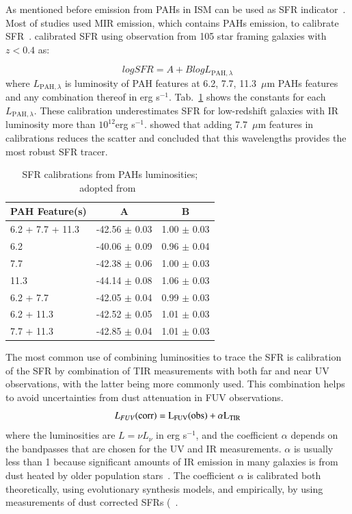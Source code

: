 As mentioned before emission from PAHs in ISM can be used as SFR indicator~\citep[e.g.][]{Peeters04}.
Most of studies used MIR emission, which contains PAHs emission, to calibrate SFR~\citep[e.g.][]{Calzetti07}.
\cite{Shipley16} calibrated SFR using observation from 105 star framing galaxies with $z < 0.4$ as:

\begin{equation}
log SFR = A + B log L_{\mathrm{PAH}, \lambda}
\end{equation}
where $L_{\mathrm{PAH}, \lambda}$ is luminosity of PAH features at 6.2, 7.7, 11.3~$\mu$m PAHs features and any combination thereof in erg s$^{-1}$.
Tab.~\ref{table_PAH} shows the constants for each $L_{\mathrm{PAH}, \lambda}$.
These calibration underestimates SFR for low-redshift galaxies with IR luminosity more than $10^12$erg s$^{-1}$.
\cite{Shipley16} showed that adding 7.7~$\mu$m features in calibrations reduces the scatter and concluded that this wavelengths provides the most robust SFR tracer.


\begin{table}
\centering
\caption{SFR calibrations from PAHs luminosities; adopted from~\cite{Shipley16}}
\label{table_PAH}
\begin{tabular}{ l c c}
\hline\hline
PAH Feature(s) & A & B\\
\hline
6.2 + 7.7 + 11.3 & -42.56 $\pm$ 0.03 & 1.00 $\pm$ 0.03 \\ 
6.2 & -40.06 $\pm$ 0.09 & 0.96 $\pm$ 0.04 \\ 
7.7 & -42.38 $\pm$ 0.06 & 1.00 $\pm$ 0.03 \\ 
11.3 & -44.14 $\pm$ 0.08 & 1.06 $\pm$ 0.03 \\ 
6.2 + 7.7 & -42.05 $\pm$ 0.04 & 0.99 $\pm$ 0.03 \\ 
6.2 + 11.3 & -42.52 $\pm$ 0.05 & 1.01 $\pm$ 0.03 \\ 
7.7 + 11.3 & -42.85 $\pm$ 0.04 & 1.01 $\pm$ 0.03 \\ 
\hline
\end{tabular}
\end{table}  

The most common use of combining luminosities to trace the SFR is calibration of the SFR by combination of TIR measurements with both far and near UV observations, with the latter being more commonly used. 
This combination helps to avoid uncertainties from dust attenuation in FUV observations.
\begin{equation}
L_{FUV}(\rm corr) = L_{FUV}(\rm obs) + \alpha L_{\rm TIR}
\end{equation}
where the luminosities are $L = \nu L_{\nu}$ in erg s$^{-1}$, and the coefficient $\alpha$ depends on the bandpasses that are chosen for the UV and IR measurements. $\alpha$ is usually less than 1 because significant amounts of IR emission in many galaxies is from dust heated by older population stars~\citep{Kennicutt12}. The coefficient $\alpha$ is calibrated both theoretically, using evolutionary synthesis models, and empirically, by using measurements of dust corrected SFRs (~\citep[e.p][]{Hao11, Leroy08}. 

